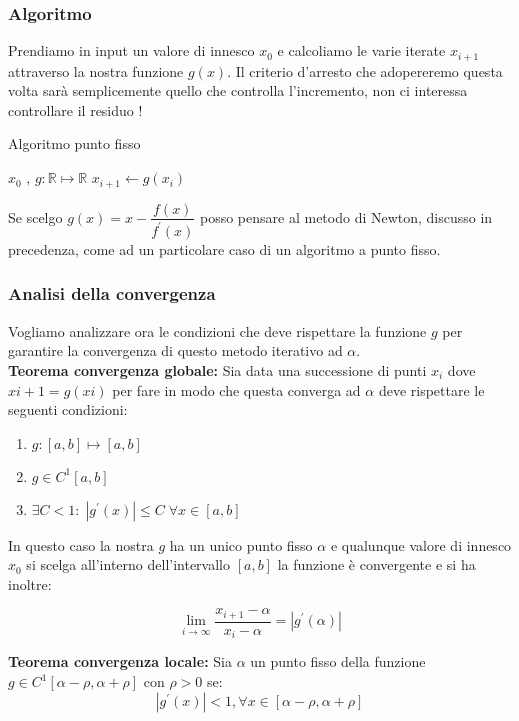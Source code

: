 \documentclass[12pt, a4paper]{book}
\theoremstyle{definition}
\begin{document}
\begin{flushleft}
\subsubsection{Algoritmo}
Prendiamo in input un valore di innesco $x_{0}$ e calcoliamo le varie iterate $x_{i+1}$ attraverso la nostra funzione $g(x)$.  Il criterio d'arresto che adopereremo questa volta sarà semplicemente quello che controlla l'incremento, non ci interessa controllare il residuo !
\begin{algorithm}
\caption{Algoritmo punto fisso}
	\begin{algorithmic} 
		\REQUIRE $x_{0}$ , $g: \mathbb{R} \mapsto \mathbb{R}$
			\STATE $ x_{i+1} \leftarrow  g(x_{i})$
		\ENDWHILE
	\end{algorithmic}
\end{algorithm}

Se scelgo $g(x) = x - \dfrac{f(x)}{f^{'}(x)}$ posso pensare al metodo di Newton, discusso in precedenza, come ad un particolare caso di un algoritmo a punto fisso.

\subsubsection{Analisi della convergenza}
Vogliamo analizzare ora le condizioni che deve rispettare la funzione $g$ per garantire la  convergenza di questo metodo iterativo ad $\alpha$.\\
\vspace{1em}
\textbf{Teorema convergenza globale:} Sia data una successione di punti $x_{i}$ dove $x{i+1} = g(x{i})$ per fare in modo che questa converga ad $\alpha$ deve rispettare le seguenti condizioni:
\begin{enumerate}
	\item $g: [a,b] \mapsto [a,b]$
	\item $g \in C^{1}[a,b]$
	\item $\exists C < 1: \; |g^{'}(x)| \leq C \; \forall x \in [a,b]$
\end{enumerate}

In questo caso la nostra $g$ ha un unico punto fisso $\alpha$ e qualunque valore di innesco $x_{0}$ si scelga all'interno dell'intervallo $[a,b]$ la funzione è convergente e si ha inoltre: 

\[ 
	\lim_{i \rightarrow \infty} \dfrac{x_{i+1} - \alpha}{x_{i} - \alpha} = |g^{'}(\alpha)| 
\]

\textbf{Teorema convergenza locale:} Sia $\alpha$ un punto fisso della funzione $g \in C^{1} [\alpha - \rho,\alpha + \rho]$ con 
$\rho > 0$ se:
\[
	|g^{'}(x)| < 1,  \forall x \in [\alpha - \rho,\alpha + \rho]
\]


\end{flushleft}
\end{document}
